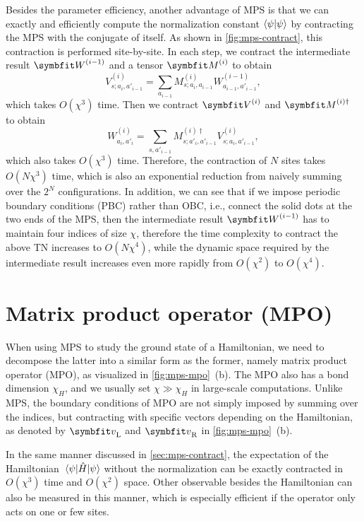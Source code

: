 Besides the parameter efficiency, another advantage of MPS is that we can exactly and efficiently compute the normalization constant $\ip{\psi}$ by contracting the MPS with the conjugate of itself. As shown in \cref{fig:mps-contract}, this contraction is performed site-by-site. In each step, we contract the intermediate result $\mW^{(i - 1)}$ and a tensor $\mM^{(i)}$ to obtain
\begin{equation}
V^{(i)}_{s; a_i, a'_{i - 1}} = \sum_{a_{i - 1}} M^{(i)}_{s; a_i, a_{i - 1}} W^{(i - 1)}_{a_{i - 1}, a'_{i - 1}},
\end{equation}
which takes $O(\chi^3)$ time. Then we contract $\mV^{(i)}$ and $\mM^{(i) \dagger}$ to obtain
\begin{equation}
W^{(i)}_{a_i, a'_i} = \sum_{s, a'_{i - 1}} M^{(i) \dagger}_{s; a'_i, a'_{i - 1}} V^{(i)}_{s; a_i, a'_{i - 1}},
\end{equation}
which also takes $O(\chi^3)$ time. Therefore, the contraction of $N$ sites takes $O(N \chi^3)$ time, which is also an exponential reduction from naively summing over the $2^N$ configurations. In addition, we can see that if we impose periodic boundary conditions (PBC) rather than OBC, i.e., connect the solid dots at the two ends of the MPS, then the intermediate result $\mW^{(i - 1)}$ has to maintain four indices of size $\chi$, therefore the time complexity to contract the above TN increases to $O(N \chi^4)$, while the dynamic space required by the intermediate result increases even more rapidly from $O(\chi^2)$ to $O(\chi^4)$.

\section{Matrix product operator (MPO)}
\label{sec:mpo}

When using MPS to study the ground state of a Hamiltonian, we need to decompose the latter into a similar form as the former, namely matrix product operator (MPO), as visualized in \cref{fig:mps-mpo}~(b). The MPO also has a bond dimension $\chi_H$, and we usually set $\chi \gg \chi_H$ in large-scale computations. Unlike MPS, the boundary conditions of MPO are not simply imposed by summing over the indices, but contracting with specific vectors depending on the Hamiltonian, as denoted by $\vv_\text{L}$ and $\vv_\text{R}$ in \cref{fig:mps-mpo}~(b).

In the same manner discussed in \cref{sec:mps-contract}, the expectation of the Hamiltonian $\mel{\psi}{\hat{H}}{\psi}$ without the normalization can be exactly contracted in $O(\chi^3)$ time and $O(\chi^2)$ space. Other observable besides the Hamiltonian can also be measured in this manner, which is especially efficient if the operator only acts on one or few sites.

